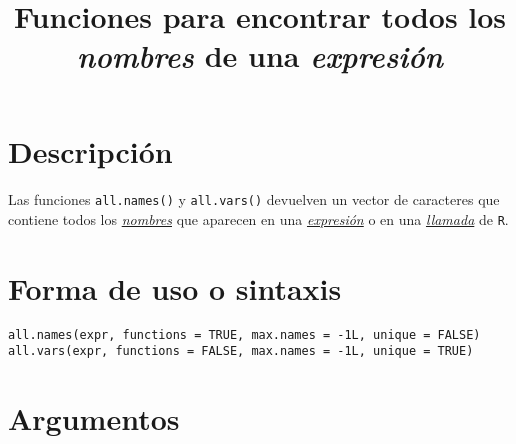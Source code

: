 \documentclass{article}[letter, 12pt]
\makeatletter
\newlength\tindent
\renewcommand{\indent}{\hspace*{\tindent}}
\def\code#1{\texttt{#1}}
\def\codename#1{\texttt{\color{gray}\small#1}}
\renewcommand{\maketitle}{\bgroup\setlength{\parindent}{0pt}
\begin{flushleft}
  \textbf{\@title}
  \@author
\end{flushleft}\egroup
}
\makeatother
\begin{document}
	\title{\Huge{Funciones para encontrar todos los \textit{nombres} de una \textit{expresión}}}
	\maketitle
	\section{\color{gray}Descripción}
	\paragraph{}
Las funciones \code{all.names()} y \code{all.vars()} devuelven un vector de caracteres que contiene todos los \href{run:/Vocabulary.pdf}{\textit{nombres}} que aparecen en una \href{run:/Vocabulary.pdf}{\textit{expresión}} o en una \href{run:/Vocabulary.pdf}{\textit{llamada}} de \codename{R}.
\tableofcontents{}
\section{\color{gray}Forma de uso o sintaxis}
\indent\code{all.names(expr, functions = TRUE, max.names = -1L, unique = FALSE)}\\
\indent\code{all.vars(expr, functions = FALSE, max.names = -1L, unique = TRUE)}\\

\section{\color{gray}Argumentos}
\end{document}
